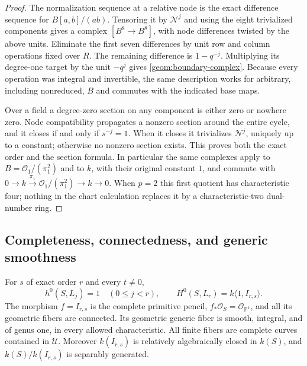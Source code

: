 \begin{proof}
The normalization sequence at a relative node is the exact
difference sequence for $B[a,b]/(ab)$.  Tensoring it by
$\mathcal N^j$ and using the eight trivialized components gives a
complex $[B^8\to B^8]$, with node differences twisted by the above
units.  Eliminate the first seven differences by unit row and column
operations fixed over $R$.  The remaining difference is
$1-q^{-j}$.  Multiplying its degree-one target by the unit $-q^j$
gives \eqref{geom:boundary-complex}.  Because every operation was
integral and invertible, the same description works for arbitrary,
including nonreduced, $B$ and commutes with the indicated base maps.

Over a field a degree-zero section on any component is either zero
or nowhere zero.  Node compatibility propagates a nonzero section
around the entire cycle, and it closes if and only if $s^{-j}=1$.
When it closes it trivializes $\mathcal N^j$, uniquely up to a
constant; otherwise no nonzero section exists.  This proves both
the exact order and the section formula.
In particular the same complexes apply to $B=\mathcal O_1/(\pi_1^2)$
and to $k$, with their original constant $1$, and commute with
$0\to k\xrightarrow{\pi_1}\mathcal O_1/(\pi_1^2)\to k\to0$.
When $p=2$ this first quotient has characteristic four; nothing in
the chart calculation replaces it by a characteristic-two
dual-number ring.
\end{proof}

\subsection{Completeness, connectedness, and generic smoothness}

\begin{theorem}\label{geom:pencil}
For $s$ of exact order $r$ and every $t\ne0$,
\[
h^0(S,L_j)=1\quad(0\leq j<r),\qquad
H^0(S,L_r)=k\langle1,I_{r,s}\rangle.
\]
The morphism $f=I_{r,s}$ is the complete primitive pencil,
$f_*\mathcal O_S=\mathcal O_{\mathbb P^1}$, and all its geometric
fibers are connected.  Its geometric generic fiber is smooth,
integral, and of genus one, in every allowed characteristic.
All finite fibers are complete curves contained in $\mathcal U$.
Moreover $k(I_{r,s})$ is relatively algebraically closed in $k(S)$,
and $k(S)/k(I_{r,s})$ is separably generated.
\end{theorem}

